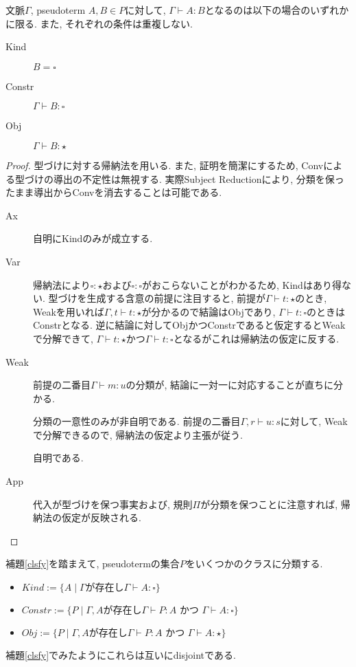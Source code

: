 \documentclass[12pt]{ltjsarticle}
\begin{document}
\begin{lem}[Classification]\label{clsfy}
 文脈$\Gamma$, pseudoterm $A, B \in P$に対して, $\Gamma \vdash A \colon B$となるのは以下の場合のいずれかに限る. また, それぞれの条件は重複しない.
 \begin{description}
  \item[Kind] $B = \square$
  \item[Constr] $\Gamma \vdash B {\colon} {\square}$
  \item[Obj] $\Gamma \vdash B {\colon} {\star}$
 \end{description}
\end{lem}
\begin{proof}
 型づけに対する帰納法を用いる. また, 証明を簡潔にするため, Convによる型づけの導出の不定性は無視する. 実際Subject Reductionにより, 分類を保ったまま導出からConvを消去することは可能である.
 \begin{description}
  \item[Ax] 自明にKindのみが成立する.
  \item[Var] 帰納法により$\square \colon \star$および$\square \colon \square$がおこらないことがわかるため, Kindはあり得ない. 型づけを生成する含意の前提に注目すると, 前提が$\Gamma \vdash t {\colon} {\star}$のとき, Weakを用いれば$\Gamma, t \vdash t {\colon} {\star}$が分かるので結論はObjであり, $\Gamma \vdash t {\colon} {\square}$のときはConstrとなる. 逆に結論に対してObjかつConstrであると仮定するとWeakで分解できて, $\Gamma \vdash t {\colon} {\star}$かつ$\Gamma \vdash t {\colon} {\square}$となるがこれは帰納法の仮定に反する.
  \item[Weak] 前提の二番目$\Gamma \vdash m {\colon} u$の分類が, 結論に一対一に対応することが直ちに分かる.
  \item[\Pi] 分類の一意性のみが非自明である. 前提の二番目$\Gamma, r \vdash u {\colon} s$に対して, Weakで分解できるので, 帰納法の仮定より主張が従う.
  \item[\lambda] 自明である.
  \item[App] 代入が型づけを保つ事実および, 規則$\Pi$が分類を保つことに注意すれば, 帰納法の仮定が反映される.
 \end{description}
\end{proof}

\begin{defn}
補題\ref{clsfy}を踏まえて, pseudotermの集合$P$をいくつかのクラスに分類する.
 \begin{itemize}
  \item $Kind := \{ A \mid \Gamma \text{が存在し} \Gamma \vdash A \colon {\square}\}$
  \item $Constr := \{ P \mid \Gamma, A \text{が存在し} \Gamma \vdash P \colon A \text{ かつ } \Gamma \vdash A \colon {\square}\}$
  \item $Obj := \{ P \mid \Gamma, A \text{が存在し} \Gamma \vdash P \colon A \text{ かつ } \Gamma \vdash A \colon {\star}\}$
 \end{itemize}
 補題\ref{clsfy}でみたようにこれらは互いにdisjointである.
\end{defn}
\end{document}
